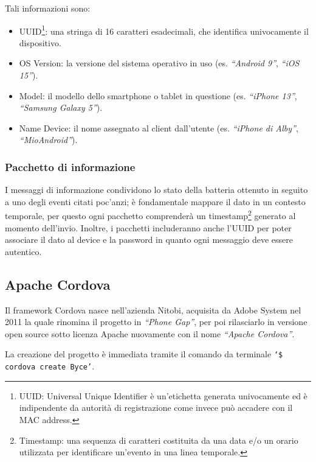 \documentclass[target=bach]{thud}
\begin{document}
        Tali informazioni sono:
        \begin{itemize}
            \setlength{\itemsep}{1pt}
            \item UUID\footnote[4]{UUID: Universal Unique Identifier è un'etichetta generata univocamente ed è indipendente da autorità di registrazione come invece può accadere con il MAC address.}: una stringa di 16 caratteri esadecimali, che identifica univocamente il dispositivo.
            \item OS Version: la versione del sistema operativo in uso (es. \textit{``Android 9''}, \textit{``iOS 15''}).
            \item Model: il modello dello smartphone o tablet in questione (es. \textit{``iPhone 13''}, \textit{``Samsung Galaxy 5''}).
            \item Name Device: il nome assegnato al client dall'utente (es. \textit{``iPhone di Alby''}, \textit{``MioAndroid''}).
        \end{itemize}

    \subsubsection{Pacchetto di informazione}
        I messaggi di informazione condividono lo stato della batteria ottenuto in seguito a uno degli eventi citati poc'anzi; è fondamentale mappare il dato in un contesto temporale, per questo ogni pacchetto comprenderà un timestamp\footnote[5]{Timestamp: una sequenza di caratteri costituita da una data e/o un orario utilizzata per identificare un'evento in una linea temporale.} generato al momento dell'invio.
        Inoltre, i pacchetti includeranno anche l'UUID per poter associare il dato al device e la password in quanto ogni messaggio deve essere autentico.



    \subsection{Apache Cordova}
        Il framework Cordova nasce nell'azienda Nitobi, acquisita da Adobe System nel 2011 la quale rinomina il progetto in \textit{``Phone Gap''}, per poi rilasciarlo in versione open source sotto licenza Apache nuovamente con il nome \textit{``Apache Cordova''}.

    La creazione del progetto è immediata tramite il comando da terminale \texttt{`\$ cordova create Byce'}.
\end{document}
